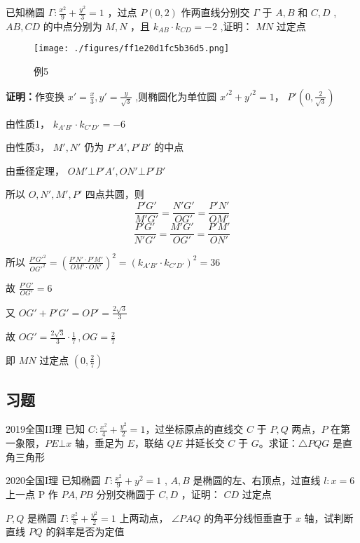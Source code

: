 \begin{example}{}
 已知椭圆 $\displaystyle{\Gamma:\frac{x^2}{9}+\frac{y^2}{3}=1}$ ，过点 $\displaystyle{P(0,2)}$ 作两直线分别交 $\displaystyle{\Gamma}$ 于 $\displaystyle{A,B}$ 和 $\displaystyle{C,D}$ , $\displaystyle{AB,CD}$ 的中点分别为 $\displaystyle{M,N}$ ，且 $\displaystyle{k_{AB}\cdot k_{CD}=-2}$ ,证明： $\displaystyle{MN}$ 过定点
\begin{figure}[ht]
\centering
\texttt{[image: ./figures/ff1e20d1fc5b36d5.png]}
\caption{例5} \label{fig_affine_12}
\end{figure}
\textbf{证明：}作变换 $\displaystyle{x'=\frac{x}{3},y'=\frac{y}{\sqrt{3}}}$ ,则椭圆化为单位圆 $\displaystyle{x'^2+y'^2=1}$， $\displaystyle{P'\left(0,\frac{2}{\sqrt{3}}\right)}$

由性质1， $\displaystyle{k_{A'B'}\cdot k_{C'D'}=-6}$

由性质3， $\displaystyle{M',N'}$ 仍为 $\displaystyle{P'A',P'B'}$ 的中点

由垂径定理， $\displaystyle{OM'\bot P'A',ON'\bot P'B'}$

所以 $\displaystyle{O,N',M',P'}$ 四点共圆，则 
$$\frac{P'G'}{M'G'}=\frac{N'G'}{OG'}=\frac{P'N'}{OM'}$$
$$\frac{P'G'}{N'G'}=\frac{M'G'}{OG'}=\frac{P'M'}{ON'}$$

所以 $\displaystyle{\frac{P'G'^2}{OG'^2}=\left(\frac{P'N'\cdot P'M'}{OM'\cdot ON'}\right)^2=\left(k_{A'B'}\cdot k_{C'D'}\right)^2=36}$ 

故 $\displaystyle{\frac{P'G'}{OG'}=6}$ 

又 $\displaystyle{OG'+P'G'=OP'=\frac{2\sqrt{3}}{3}}$ 

故 $\displaystyle{OG'=\frac{2\sqrt{3}}{3}\cdot\frac{1}{7}\,,OG=\frac{2}{7}}$ 

即 $\displaystyle{MN}$ 过定点 $\displaystyle{\left(0,\frac{2}{7}\right)}$ 
\end{example}
\subsection{习题}
\begin{exercise}{2019全国II理}
已知 $\displaystyle{C:\frac{x^2}4+\frac{y^2}2=1}$，过坐标原点的直线交 $\displaystyle{C}$ 于 $\displaystyle{P,Q}$ 两点，$\displaystyle{P}$ 在第一象限，$\displaystyle{PE\bot x}$ 轴，垂足为 $\displaystyle{E}$，联结 $\displaystyle{QE}$ 并延长交 $\displaystyle{C}$ 于 $\displaystyle{G}$。求证：$\displaystyle{\triangle PQG}$ 是直角三角形
\end{exercise}
\begin{exercise}{2020全国I理}
已知椭圆 $\displaystyle{\Gamma:\frac{x^2}{9}+y^2=1}$ , $\displaystyle{A,B}$ 是椭圆的左、右顶点，过直线 $\displaystyle{l:x=6}$ 上一点 P 作 $\displaystyle{PA,PB}$ 分别交椭圆于 $\displaystyle{C,D}$ ，证明： $\displaystyle{CD}$ 过定点
\end{exercise}

\begin{exercise}{}
 $\displaystyle{P,Q}$ 是椭圆 $\displaystyle{\Gamma:\frac{x^2}{8}+\frac{y^2}{2}=1}$ 上两动点， $\displaystyle{\angle PAQ}$ 的角平分线恒垂直于 $\displaystyle{x}$ 轴，试判断直线 $\displaystyle{PQ}$ 的斜率是否为定值
\end{exercise}
